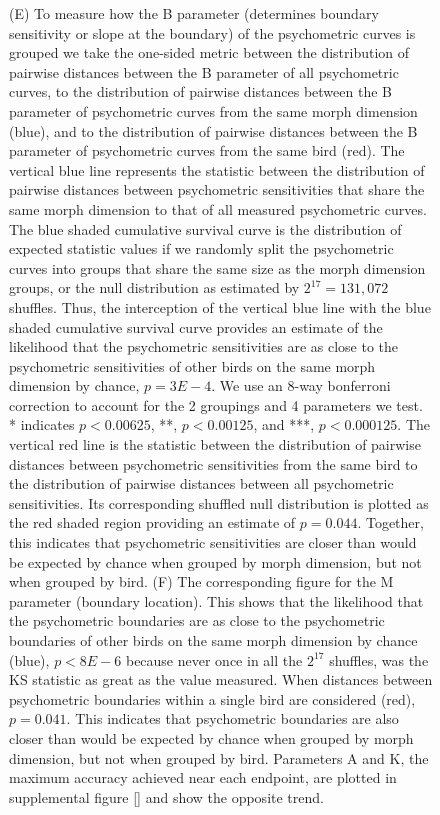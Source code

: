 \begin{figure}[tp]
{(E)	To measure how the B parameter (determines boundary sensitivity or slope at the boundary) of the psychometric curves is grouped we take the one-sided \KS metric between the distribution of pairwise distances between the B parameter of all psychometric curves, to the distribution of pairwise distances between the B parameter of psychometric curves from the same morph dimension (blue), and to the distribution of pairwise distances between the B parameter of psychometric curves from the same bird (red). The vertical blue line represents the \KS statistic between the distribution of pairwise distances between psychometric sensitivities that share the same morph dimension to that of all measured psychometric curves. The blue shaded cumulative survival curve is the distribution of expected \KS statistic values if we randomly split the psychometric curves into groups that share the same size as the morph dimension groups, or the null distribution as estimated by $2^{17}=131,072$ shuffles. Thus, the interception of the vertical blue line with the blue shaded cumulative survival curve provides an estimate of the likelihood that the psychometric sensitivities are as close to the psychometric sensitivities of other birds on the same morph dimension by chance, $p=3E-4$. We use an 8-way bonferroni correction to account for the 2 groupings and 4 parameters we test. * indicates $p<0.00625$, **, $p<0.00125$, and ***, $p<0.000125$. The vertical red line is the \KS statistic between the distribution of pairwise distances between psychometric sensitivities from the same bird to the distribution of pairwise distances between all psychometric sensitivities. Its corresponding shuffled null distribution is plotted as the red shaded region providing an estimate of $p=0.044$. Together, this indicates that psychometric sensitivities are closer than would be expected by chance when grouped by morph dimension, but not when grouped by bird.
(F)	The corresponding figure for the M parameter (boundary location). This shows that the likelihood that the psychometric boundaries are as close to the psychometric boundaries of other birds on the same morph dimension by chance (blue), $p<8E-6$ because never once in all the $2^{17}$ shuffles, was the KS statistic as great as the value measured. When distances between psychometric boundaries within a single bird are considered (red), $p=0.041$. This indicates that psychometric boundaries are also closer than would be expected by chance when grouped by morph dimension, but not when grouped by bird. Parameters A and K, the maximum accuracy achieved near each endpoint, are plotted in supplemental figure \ref{} and show the opposite trend.
}
\end{figure}